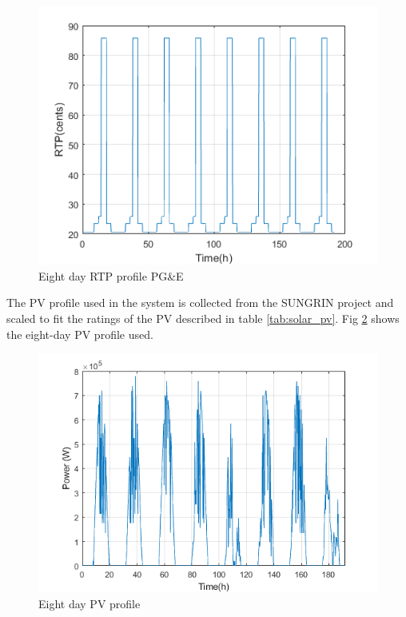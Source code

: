 \begin{figure}[!ht]
    \centering
    \includegraphics[width = \linewidth]{figs/PGNE_PRICE.png}
    \caption{Eight day RTP profile PG\&E}
    \label{fig:PGNE_PRICE}
\end{figure}

The PV profile used in the system is collected from the SUNGRIN project and scaled to fit the ratings of the PV described in table \ref{tab:solar_pv}. Fig \ref{fig:PV_PROFILE_8} shows the eight-day PV profile used.

\begin{figure}[!ht]
    \centering
    \includegraphics[width = \linewidth]{figs/PV_PROFILE.png}
    \caption{Eight day PV profile}
    \label{fig:PV_PROFILE_8}
\end{figure}


